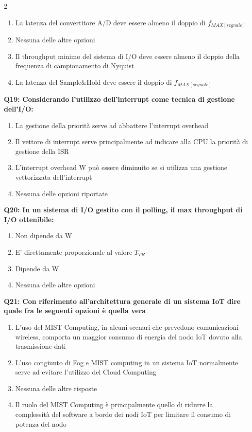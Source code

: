 \documentclass[10pt]{article}
\begin{document}
\begin{multicols}{2}
\begin{enumerate}[label=\arabic*.]
\item La latenza del convertitore A/D deve essere almeno il doppio di $f_{MAX[segnale]}$
\item Nessuna delle altre opzioni
\item Il throughput minimo del sistema di I/O deve essere almeno il doppio della frequenza di campionamento di Nyquist
\item La latenza del Sample\&Hold deve essere il doppio di $f_{MAX[segnale]}$
\end{enumerate}
\textbf{Q19: Considerando l’utilizzo dell’interrupt come tecnica di gestione dell’I/O:}

\begin{enumerate}[label=\arabic*.]
\item La gestione della priorità serve ad abbattere l’interrupt overhead
\item Il vettore di interrupt serve principalmente ad indicare alla CPU la priorità di gestione della ISR
\item L’interrupt overhead W può essere diminuito se si utilizza una gestione vettorizzata dell’interrupt
\item Nessuna delle opzioni riportate
\end{enumerate}
\textbf{Q20: In un sistema di I/O gestito con il polling, il max throughput di I/O ottenibile:}

\begin{enumerate}[label=\arabic*.]
\item Non dipende da W
\item E' direttamente proporzionale al valore $T_{TR}$
\item Dipende da W
\item Nessuna delle altre opzioni
\end{enumerate}
\textbf{Q21: Con riferimento all’architettura generale di un sistema IoT dire quale fra le seguenti opzioni è quella vera}

\begin{enumerate}[label=\arabic*.]
\item L’uso del MIST Computing, in alcuni scenari che prevedono comunicazioni wireless, comporta un maggior consumo di energia del nodo IoT dovuto alla trasmissione dati
\item L’uso congiunto di Fog e MIST computing in un sistema IoT normalmente serve ad evitare l’utilizzo del Cloud Computing
\item Nessuna delle altre risposte
\item Il ruolo del MIST Computing è principalmente quello di ridurre la complessità del software a bordo dei nodi IoT per limitare il consumo di potenza del nodo
\end{enumerate}
\end{multicols}
\end{document}
